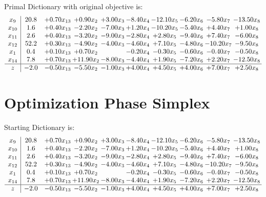 \documentclass[9pt]{article}
\begin{document}
Primal Dictionary with original objective is:
\[\begin{array}{c| c c@{\hskip 2pt} c@{\hskip 2pt} c@{\hskip 2pt} c@{\hskip 2pt} c@{\hskip 2pt} c@{\hskip 2pt} c@{\hskip 2pt} c@{\hskip 2pt} }
 x_{9}   &  20.8 & +  0.70 x_{13} & +  0.90 x_{2} & +  3.00 x_{3} & -8.40 x_{4} & -12.10 x_{5} & -6.20 x_{6} & -5.80 x_{7} & -13.50 x_{8}\\
 x_{10}   &  1.6 & +  0.40 x_{13} & -2.20 x_{2} & -7.00 x_{3} & +  1.20 x_{4} & -10.20 x_{5} & -5.40 x_{6} & +  4.40 x_{7} & +  1.00 x_{8}\\
 x_{11}   &  2.6 & +  0.40 x_{13} & -3.20 x_{2} & -9.00 x_{3} & -2.80 x_{4} & +  2.80 x_{5} & -9.40 x_{6} & +  7.40 x_{7} & -6.00 x_{8}\\
 x_{12}   &  52.2 & +  0.30 x_{13} & -4.90 x_{2} & -4.00 x_{3} & -4.60 x_{4} & +  7.10 x_{5} & -4.80 x_{6} & -10.20 x_{7} & -9.50 x_{8}\\
 x_{1}   &  0.4 & +  0.10 x_{13} & +  0.70 x_{2} &   & -0.20 x_{4} & -0.30 x_{5} & -0.60 x_{6} & -0.40 x_{7} & -0.50 x_{8}\\
 x_{14}   &  7.8 & +  0.70 x_{13} & + 11.90 x_{2} & -8.00 x_{3} & -4.40 x_{4} & +  1.90 x_{5} & -7.20 x_{6} & +  2.20 x_{7} & -12.50 x_{8}\\
\hline
z    &  -2.0 & -0.50 x_{13} & -5.50 x_{2} & -1.00 x_{3} & +  4.00 x_{4} & +  4.50 x_{5} & +  4.00 x_{6} & +  7.00 x_{7} & +  2.50 x_{8}\\
\end{array}\]
\section{Optimization Phase Simplex}
Starting Dictionary is:
\[\begin{array}{c| c c@{\hskip 2pt} c@{\hskip 2pt} c@{\hskip 2pt} c@{\hskip 2pt} c@{\hskip 2pt} c@{\hskip 2pt} c@{\hskip 2pt} c@{\hskip 2pt} }
 x_{9}   &  20.8 & +  0.70 x_{13} & +  0.90 x_{2} & +  3.00 x_{3} & -8.40 x_{4} & -12.10 x_{5} & -6.20 x_{6} & -5.80 x_{7} & -13.50 x_{8}\\
 x_{10}   &  1.6 & +  0.40 x_{13} & -2.20 x_{2} & -7.00 x_{3} & +  1.20 x_{4} & -10.20 x_{5} & -5.40 x_{6} & +  4.40 x_{7} & +  1.00 x_{8}\\
 x_{11}   &  2.6 & +  0.40 x_{13} & -3.20 x_{2} & -9.00 x_{3} & -2.80 x_{4} & +  2.80 x_{5} & -9.40 x_{6} & +  7.40 x_{7} & -6.00 x_{8}\\
 x_{12}   &  52.2 & +  0.30 x_{13} & -4.90 x_{2} & -4.00 x_{3} & -4.60 x_{4} & +  7.10 x_{5} & -4.80 x_{6} & -10.20 x_{7} & -9.50 x_{8}\\
 x_{1}   &  0.4 & +  0.10 x_{13} & +  0.70 x_{2} &   & -0.20 x_{4} & -0.30 x_{5} & -0.60 x_{6} & -0.40 x_{7} & -0.50 x_{8}\\
 x_{14}   &  7.8 & +  0.70 x_{13} & + 11.90 x_{2} & -8.00 x_{3} & -4.40 x_{4} & +  1.90 x_{5} & -7.20 x_{6} & +  2.20 x_{7} & -12.50 x_{8}\\
\hline
z    &  -2.0 & -0.50 x_{13} & -5.50 x_{2} & -1.00 x_{3} & +  4.00 x_{4} & +  4.50 x_{5} & +  4.00 x_{6} & +  7.00 x_{7} & +  2.50 x_{8}\\
\end{array}\]
\end{document}
